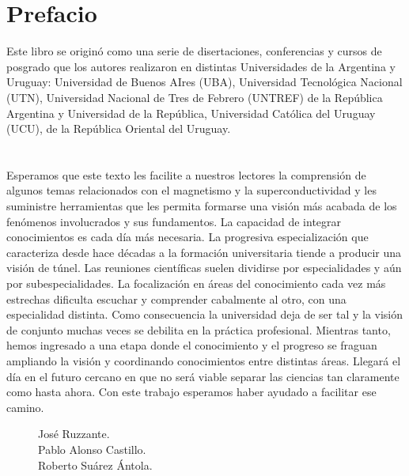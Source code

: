 \documentclass[
11pt, %
spanish,
singlespacing, %
parskip, %
headsepline, %
]{MastersDoctoralThesis} %
\begin{document}
\chapter*{Prefacio}


{\larger
\hspace{20mm} Este libro se originó como una serie de disertaciones, 
conferencias y cursos de posgrado que los autores realizaron en distintas Universidades de la Argentina y Uruguay: Universidad de Buenos AIres (UBA), Universidad Tecnológica Nacional (UTN), Universidad Nacional de Tres de Febrero (UNTREF) de la República Argentina y Universidad de la República, Universidad Católica del Uruguay (UCU), de la República Oriental del Uruguay.    
}

\chapter*{ }



\hspace{20mm}Esperamos que este texto les facilite a nuestros lectores la comprensión de algunos temas relacionados con el magnetismo y la superconductividad y les suministre herramientas que les permita formarse una visión más acabada de los fenómenos involucrados y sus fundamentos. La capacidad de integrar conocimientos es cada día más necesaria.  La progresiva especialización que caracteriza desde hace décadas a la formación universitaria tiende a producir una visión de túnel. Las reuniones científicas suelen dividirse por especialidades y aún por subespecialidades. La focalización en áreas del conocimiento cada vez más estrechas dificulta escuchar y comprender cabalmente al otro, con una especialidad distinta. Como consecuencia la universidad deja de ser tal y la visión de conjunto muchas veces se debilita en la práctica profesional.  Mientras tanto, hemos ingresado a una etapa donde el conocimiento y el progreso se fraguan ampliando la visión y coordinando conocimientos entre distintas áreas. Llegará el día en el futuro cercano en que no será viable separar las ciencias tan claramente como hasta ahora. Con este trabajo esperamos haber ayudado a facilitar ese camino.\\

\begin{figure}[H]
  \begin{minipage}[b]{0.7\textwidth}
	  \vspace{0cm}
  \end{minipage}
  \hfill
  \begin{minipage}[b]{0.3\textwidth}
  
José Ruzzante.\\
Pablo Alonso Castillo.\\
Roberto Suárez Ántola.\\
  \end{minipage}
\end{figure}
\end{document}
